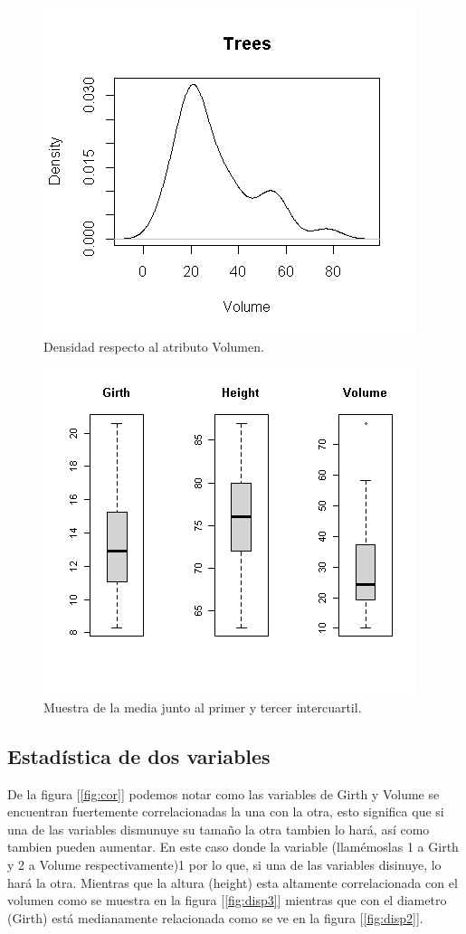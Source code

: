 \documentclass[12pt,a4paper]{article}
\begin{document}
\begin{figure}
\centering
\includegraphics[scale=0.9]{Densidad3}
\caption{ Densidad respecto al atributo Volumen.}
\end{figure}

\begin{figure}
\centering
\includegraphics[scale=0.9]{cajab}
\caption{ Muestra de la media junto al primer y tercer intercuartil.  }
\label{fig:cajab}
\end{figure}
 
\newpage
\subsection{Estadística de dos variables}
De la figura [\ref{fig:cor}] podemos notar como las variables de Girth y Volume se encuentran fuertemente correlacionadas la una con la otra, esto significa que si una de las variables dismunuye su tamaño la otra tambien lo hará, así como tambien pueden aumentar. En este caso donde la variable (llamémoslas 1 a Girth y 2 a Volume respectivamente)1 por lo que, si una de las variables disinuye, lo hará la otra. Mientras que la altura (height) esta altamente correlacionada con el volumen como se muestra en la figura [\ref{fig:disp3}] mientras que con el diametro (Girth) está medianamente relacionada como se ve en la figura [\ref{fig:disp2}].   
\citep{repositorio}
\end{document}
